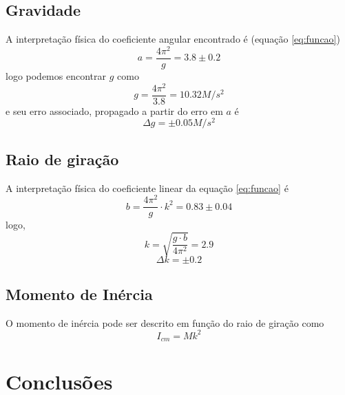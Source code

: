\documentclass[12pt,a4paper]{article}
\begin{document}
\subsection{Gravidade}
A interpretação física do coeficiente angular encontrado é (equação \ref{eq:funcao})
 $$ a = \frac{4\pi^2}{g} = 3.8 \pm 0.2$$
  logo podemos encontrar $g$ como 
  $$ g = \frac{4\pi^2}{3.8} = 10.32 M/s^2 $$ 
  e seu erro associado, propagado a partir do erro em $a$ é
  $$ \Delta g =\pm 0.05 M/s^2 $$
  
\subsection{Raio de giração}

A interpretação física do coeficiente linear da equação \ref{eq:funcao} é 
$$ b = \frac{4\pi^2}{g} \cdot k^2 = 0.83 \pm 0.04 $$
logo, 
$$ k = \sqrt{\frac{g \cdot b}{4\pi^2}} = 2.9 $$
$$ \Delta k = \pm 0.2 $$

\subsection{Momento de Inércia}
O momento de inércia pode ser descrito em função do raio de giração como 
$$ I_{cm} = Mk^2 $$


\section{Conclusões}
\end{document}
